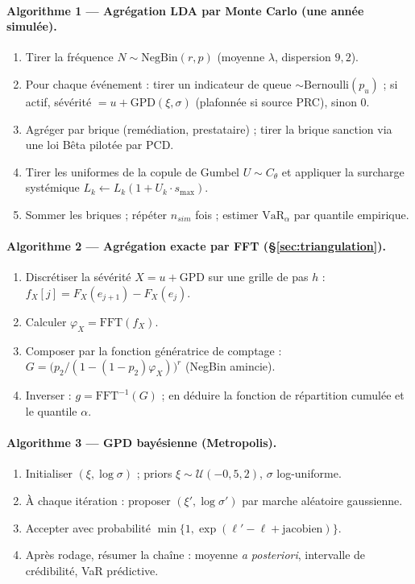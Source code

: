 \documentclass[11pt,a4paper]{article}
\theoremstyle{navystyle}
\theoremstyle{navydef}
\newcommand{\VaR}{\mathrm{VaR}}
\begin{document}
\paragraph{Algorithme 1 --- Agrégation LDA par Monte Carlo (une année simulée).}
\begin{enumerate}[leftmargin=2.2em,itemsep=1pt]
\item Tirer la fréquence $N\sim\mathrm{NegBin}(r,p)$ (moyenne $\lambda$, dispersion $9{,}2$).
\item Pour chaque événement : tirer un indicateur de queue $\sim\mathrm{Bernoulli}(p_u)$ ; si actif, sévérité $=u+\mathrm{GPD}(\xi,\sigma)$ (plafonnée si source PRC), sinon $0$.
\item Agréger par brique (remédiation, prestataire) ; tirer la brique sanction via une loi Bêta pilotée par $\mathrm{PCD}$.
\item Tirer les uniformes de la copule de Gumbel $U\sim C_\theta$ et appliquer la surcharge systémique $L_k\leftarrow L_k(1+U_k\cdot s_{\max})$.
\item Sommer les briques ; répéter $n_{sim}$ fois ; estimer $\VaR_\alpha$ par quantile empirique.
\end{enumerate}

\paragraph{Algorithme 2 --- Agrégation exacte par FFT (§\ref{sec:triangulation}).}
\begin{enumerate}[leftmargin=2.2em,itemsep=1pt]
\item Discrétiser la sévérité $X=u+\mathrm{GPD}$ sur une grille de pas $h$ : $f_X[j]=F_X(e_{j+1})-F_X(e_j)$.
\item Calculer $\varphi_X=\mathrm{FFT}(f_X)$.
\item Composer par la fonction génératrice de comptage : $G=\bigl(p_2/(1-(1-p_2)\varphi_X)\bigr)^{r}$ (NegBin amincie).
\item Inverser : $g=\mathrm{FFT}^{-1}(G)$ ; en déduire la fonction de répartition cumulée et le quantile $\alpha$.
\end{enumerate}

\paragraph{Algorithme 3 --- GPD bayésienne (Metropolis).}
\begin{enumerate}[leftmargin=2.2em,itemsep=1pt]
\item Initialiser $(\xi,\log\sigma)$ ; priors $\xi\sim\mathcal U(-0{,}5,2)$, $\sigma$ log-uniforme.
\item À chaque itération : proposer $(\xi',\log\sigma')$ par marche aléatoire gaussienne.
\item Accepter avec probabilité $\min\{1,\exp(\ell'-\ell+\text{jacobien})\}$.
\item Après rodage, résumer la chaîne : moyenne \emph{a posteriori}, intervalle de crédibilité, VaR prédictive.
\end{enumerate}
\end{document}
